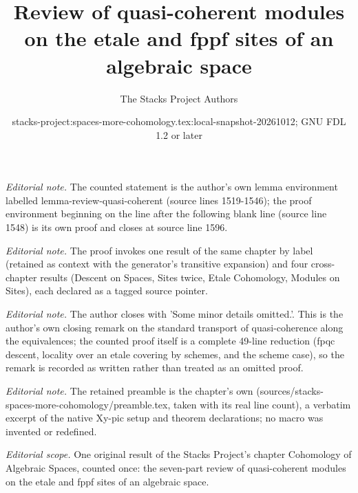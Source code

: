 \documentclass{stacks-project}
\title{Review of quasi-coherent modules on the etale and fppf sites of an algebraic space}
\author{The Stacks Project Authors}
\date{stacks-project:spaces-more-cohomology.tex:local-snapshot-20261012; GNU FDL 1.2 or later}
\theoremstyle{plain}
\theoremstyle{definition}
\theoremstyle{remark}
\numberwithin{equation}{subsection}
\begin{document}
\maketitle
\noindent\textit{Editorial note.} The counted statement is the author's own lemma environment labelled lemma-review-quasi-coherent (source lines 1519-1546); the proof environment beginning on the line after the following blank line (source line 1548) is its own proof and closes at source line 1596.\par\medskip
\noindent\textit{Editorial note.} The proof invokes one result of the same chapter by label (retained as context with the generator's transitive expansion) and four cross-chapter results (Descent on Spaces, Sites twice, Etale Cohomology, Modules on Sites), each declared as a tagged source pointer.\par\medskip
\noindent\textit{Editorial note.} The author closes with 'Some minor details omitted.'. This is the author's own closing remark on the standard transport of quasi-coherence along the equivalences; the counted proof itself is a complete 49-line reduction (fpqc descent, locality over an etale covering by schemes, and the scheme case), so the remark is recorded as written rather than treated as an omitted proof.\par\medskip
\noindent\textit{Editorial note.} The retained preamble is the chapter's own (sources/stacks-spaces-more-cohomology/preamble.tex, taken with its real line count), a verbatim excerpt of the native Xy-pic setup and theorem declarations; no macro was invented or redefined.\par\medskip
\noindent\textit{Editorial scope.} One original result of the Stacks Project's chapter Cohomology of Algebraic Spaces, counted once: the seven-part review of quasi-coherent modules on the etale and fppf sites of an algebraic space.\par\medskip
\end{document}
